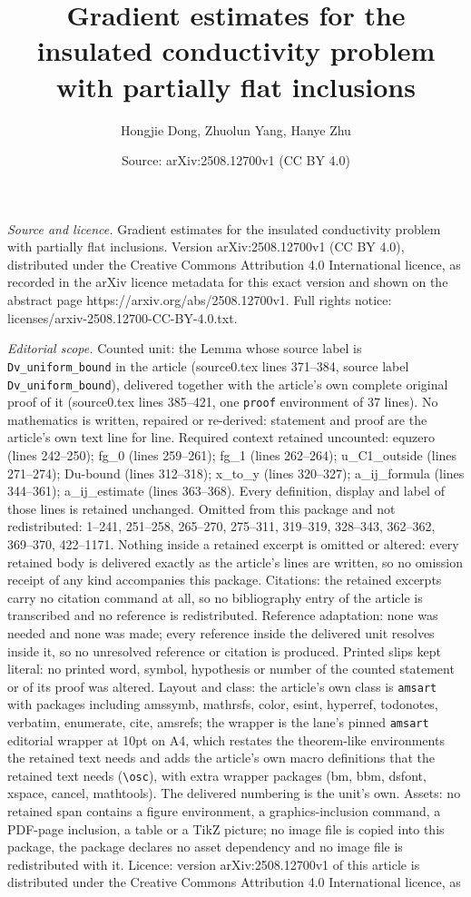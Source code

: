 \documentclass[10pt,a4paper]{amsart}
\title[Gradient estimates for the insulated conductivity problem wi]{Gradient estimates for the insulated conductivity problem with partially flat inclusions}
\author{Hongjie Dong, Zhuolun Yang, Hanye Zhu}
\date{Source: arXiv:2508.12700v1 (CC BY 4.0)}
\begin{document}
\maketitle

\noindent\emph{Source and licence.} Gradient estimates for the insulated conductivity problem with partially flat inclusions. Version arXiv:2508.12700v1 (CC BY 4.0), distributed under the Creative Commons Attribution 4.0 International licence, as recorded in the arXiv licence metadata for this exact version and shown on the abstract page https://arxiv.org/abs/2508.12700v1. Full rights notice: licenses/arxiv-2508.12700-CC-BY-4.0.txt.\par\smallskip

\noindent\textit{Editorial scope.} Counted unit: the Lemma whose source label is \texttt{Dv\_uniform\_bound} in the article (source0.tex lines 371--384, source label \texttt{Dv\_uniform\_bound}), delivered together with the article's own complete original proof of it (source0.tex lines 385--421, one \texttt{proof} environment of 37 lines). No mathematics is written, repaired or re-derived: statement and proof are the article's own text line for line. Required context retained uncounted: equzero (lines 242--250); fg\_0 (lines 259--261); fg\_1 (lines 262--264); u\_C1\_outside (lines 271--274); Du-bound (lines 312--318); x\_to\_y (lines 320--327); a\_ij\_formula (lines 344--361); a\_ij\_estimate (lines 363--368). Every definition, display and label of those lines is retained unchanged. Omitted from this package and not redistributed: 1--241, 251--258, 265--270, 275--311, 319--319, 328--343, 362--362, 369--370, 422--1171. Nothing inside a retained excerpt is omitted or altered: every retained body is delivered exactly as the article's lines are written, so no omission receipt of any kind accompanies this package. Citations: the retained excerpts carry no citation command at all, so no bibliography entry of the article is transcribed and no reference is redistributed. Reference adaptation: none was needed and none was made; every reference inside the delivered unit resolves inside it, so no unresolved reference or citation is produced. Printed slips kept literal: no printed word, symbol, hypothesis or number of the counted statement or of its proof was altered. Layout and class: the article's own class is \texttt{amsart} with packages including amssymb, mathrsfs, color, esint, hyperref, todonotes, verbatim, enumerate, cite, amsrefs; the wrapper is the lane's pinned \texttt{amsart} editorial wrapper at 10pt on A4, which restates the theorem-like environments the retained text needs and adds the article's own macro definitions that the retained text needs (\texttt{\textbackslash osc}), with extra wrapper packages (bm, bbm, dsfont, xspace, cancel, mathtools). The delivered numbering is the unit's own. Assets: no retained span contains a figure environment, a graphics-inclusion command, a PDF-page inclusion, a table or a TikZ picture; no image file is copied into this package, the package declares no asset dependency and no image file is redistributed with it. Licence: version arXiv:2508.12700v1 of this article is distributed under the Creative Commons Attribution 4.0 International licence, as 
\end{document}
